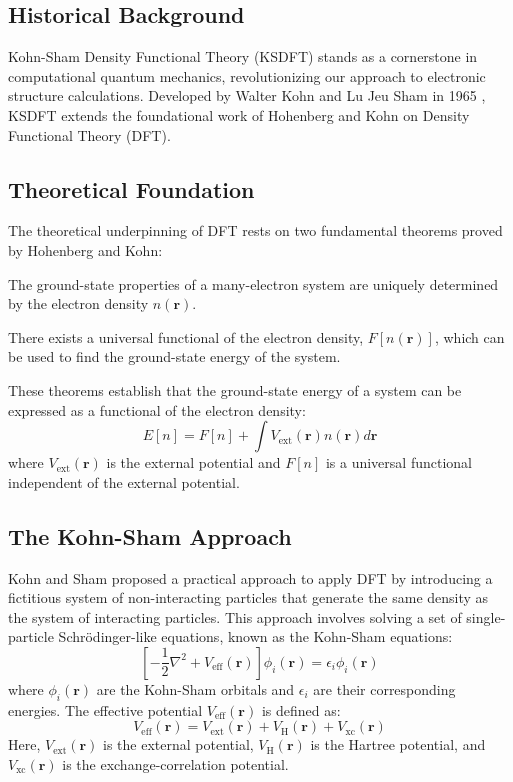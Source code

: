 \subsection{Historical Background}
Kohn-Sham Density Functional Theory (KSDFT) stands as a cornerstone in computational quantum mechanics, revolutionizing our approach to electronic structure calculations. Developed by Walter Kohn and Lu Jeu Sham in 1965 \cite{KohnSham1965}, KSDFT extends the foundational work of Hohenberg and Kohn \cite{HohenbergKohn1964} on Density Functional Theory (DFT).
\subsection{Theoretical Foundation}
The theoretical underpinning of DFT rests on two fundamental theorems proved by Hohenberg and Kohn:
\begin{theorem}
The ground-state properties of a many-electron system are uniquely determined by the electron density $n(\mathbf{r})$.
\end{theorem}
\begin{theorem}
There exists a universal functional of the electron density, $F[n(\mathbf{r})]$, which can be used to find the ground-state energy of the system.
\end{theorem}
These theorems establish that the ground-state energy of a system can be expressed as a functional of the electron density:
\begin{equation}
E[n] = F[n] + \int V_{\text{ext}}(\mathbf{r})n(\mathbf{r})d\mathbf{r}
\end{equation}
where $V_{\text{ext}}(\mathbf{r})$ is the external potential and $F[n]$ is a universal functional independent of the external potential.
\subsection{The Kohn-Sham Approach}
Kohn and Sham proposed a practical approach to apply DFT by introducing a fictitious system of non-interacting particles that generate the same density as the system of interacting particles. This approach involves solving a set of single-particle Schrödinger-like equations, known as the Kohn-Sham equations:
\begin{equation}
\left[-\frac{1}{2}\nabla^2 + V_{\text{eff}}(\mathbf{r})\right]\phi_i(\mathbf{r}) = \epsilon_i\phi_i(\mathbf{r})
\end{equation}
where $\phi_i(\mathbf{r})$ are the Kohn-Sham orbitals and $\epsilon_i$ are their corresponding energies. The effective potential $V_{\text{eff}}(\mathbf{r})$ is defined as:
\begin{equation}
V_{\text{eff}}(\mathbf{r}) = V_{\text{ext}}(\mathbf{r}) + V_{\text{H}}(\mathbf{r}) + V_{\text{xc}}(\mathbf{r})
\end{equation}
Here, $V_{\text{ext}}(\mathbf{r})$ is the external potential, $V_{\text{H}}(\mathbf{r})$ is the Hartree potential, and $V_{\text{xc}}(\mathbf{r})$ is the exchange-correlation potential.
